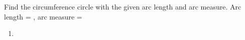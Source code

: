 Find the circumference circle with the given arc length and arc measure.
\newline
Arc length = , arc measure = \degree
\newline
\begin{enumerate}
    \item
    \degree
{}
\end{enumerate}

